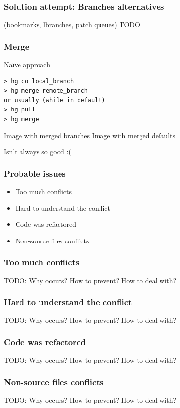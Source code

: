 \documentclass{beamer}
\begin{document}
\begin{frame} 
\frametitle{Solution attempt: Branches alternatives}
(bookmarks, lbranches, patch queues)
TODO
\end{frame}


\begin{frame}[fragile]
\frametitle{Merge}
\begin{exampleblock}{Naïve approach}
\begin{verbatim}
> hg co local_branch
> hg merge remote_branch
or usually (while in default)
> hg pull 
> hg merge 
\end{verbatim}
\end{exampleblock}
\begin{multicols}{2}
Image with merged branches
\columnbreak
{}
Image with merged defaults
\end{multicols}
\begin{center}
Isn't always so good :( 
\end{center}
\end{frame}

\begin{frame}
\frametitle{Probable issues}
\begin{itemize}
\item Too much conflicts
\item Hard to understand the conflict
\item Code was refactored
\item Non-source files conflicts
\end{itemize}
\end{frame}

\begin{frame}
\frametitle{Too much conflicts}
TODO: Why occurs? How to prevent? How to deal with? 
\end{frame}

\begin{frame}
\frametitle{Hard to understand the conflict}
TODO: Why occurs? How to prevent? How to deal with? 
\end{frame}

\begin{frame}
\frametitle{Code was refactored}
TODO: Why occurs? How to prevent? How to deal with? 
\end{frame}

\begin{frame}
\frametitle{Non-source files conflicts}
TODO: Why occurs? How to prevent? How to deal with? 
\end{frame}
\end{document}
